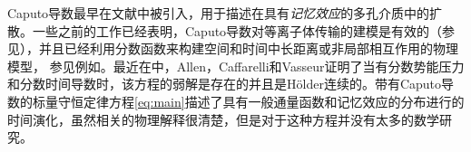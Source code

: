 Caputo导数最早在文献中被引入，用于描述在具有{\it 记忆效应}的多孔介质中的扩散。一些之前的工作已经表明，Caputo导数对等离子体传输的建模是有效的（参见），并且已经利用分数函数来构建空间和时间中长距离或非局部相互作用的物理模型， 参见例如。最近在中，Allen，Caffarelli和Vasseur证明了当有分数势能压力和分数时间导数时，该方程的弱解是存在的并且是H\"older连续的。带有Caputo导数的标量守恒定律方程\eqref{eq:main}描述了具有一般通量函数和记忆效应的分布进行的时间演化，虽然相关的物理解释很清楚，但是对于这种方程并没有太多的数学研究。


